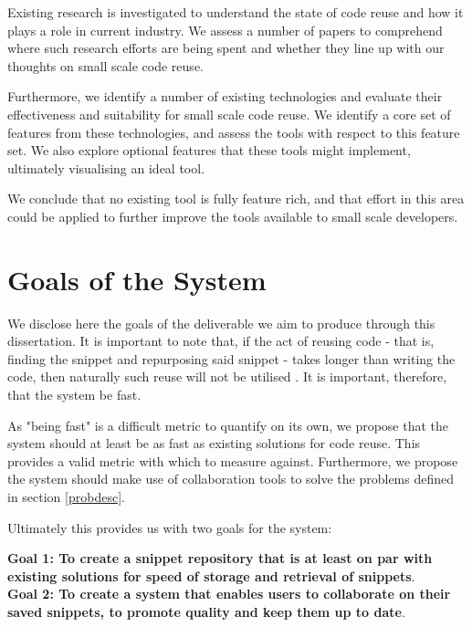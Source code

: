 Existing research is investigated to understand the state of code reuse and how it plays a role in current industry.
We assess a number of papers to comprehend where such research efforts are being spent and whether they line up with our thoughts on small scale code reuse.

Furthermore, we identify a number of existing technologies and evaluate their effectiveness and suitability for small scale code reuse.
We identify a core set of features from these technologies, and assess the tools with respect to this feature set. 
We also explore optional features that these tools might implement, ultimately visualising an ideal tool.

We conclude that no existing tool is fully feature rich, and that effort in this area could be applied to further improve the tools available to small scale developers.

\section{Goals of the System} \label{goals}
We disclose here the goals of the deliverable we aim to produce through this dissertation.
It is important to note that, if the act of reusing code - that is, finding the snippet and repurposing said snippet - takes longer than writing the code, then naturally such reuse will not be utilised \cite{Krueger1992}.
It is important, therefore, that the system be fast.


As "being fast" is a difficult metric to quantify on its own, we propose that the system should at least be as fast as existing solutions for code reuse.
This provides a valid metric with which to measure against.
Furthermore, we propose the system should make use of collaboration tools to solve the problems defined in section \ref{probdesc}.

Ultimately this provides us with two goals for the system:

\textbf{Goal 1: To create a snippet repository that is at least on par with existing solutions for speed of storage and retrieval of snippets}. \\
\textbf{Goal 2: To create a system that enables users to collaborate on their saved snippets, to promote quality and keep them up to date}.

